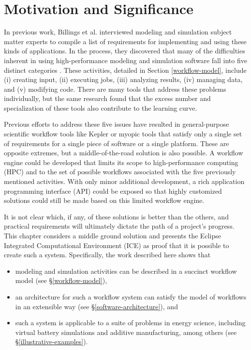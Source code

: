 \section{Motivation and Significance}\label{motivation-and-significance}

In previous work, Billings et al. interviewed modeling and simulation subject
matter experts to compile a list of requirements for implementing and using
these kinds of applications. In the process, they discovered that many of the
difficulties inherent in using high-performance modeling and simulation
software fall into five distinct categories \cite{billings_designing_2009}.
These activities, detailed in Section \ref{workflow-model}, include (i)
creating input, (ii) executing jobs, (iii) analyzing results, (iv) managing
data, and (v) modifying code. There are many tools that address these problems
individually, but the same research found that the excess number and
specialization of these tools also contribute to the learning curve.

Previous efforts to address these five issues have resulted in general-purpose
scientific workflow tools like Kepler \cite{ludascher_scientific_2006} or
myopic tools that satisfy only a single set of requirements for a single piece
of software or a single platform. These are opposite extremes, but a
middle-of-the-road solution is also possible. A workflow engine could be
developed that limits its scope to high-performance computing (HPC) and to the
set of possible workflows associated with the five previously mentioned
activities. With only minor additional development, a rich application
programming interface (API) could be exposed so that highly customized
solutions could still be made based on this limited workflow engine.

It is not clear which, if any, of these solutions is better than the
others, and practical requirements will ultimately dictate the path of a
project's progress. This chapter considers a middle ground solution and
presents the Eclipse Integrated Computational Environment (ICE) as proof
that it is possible to create such a system. Specifically, the work
described here shows that

\begin{itemize}
\item
  modeling and simulation activities can be described in a succinct
  workflow model (see \S \ref{workflow-model}),
\item
  an architecture for such a workflow system can satisfy the model of
  workflows in an extensible way (see \S \ref{software-architecture}), and 
\item
  such a system is applicable to a suite of problems in energy science,
  including virtual battery simulations and additive manufacturing, 
  among others (see \S \ref{illustrative-examples}).
\end{itemize}

